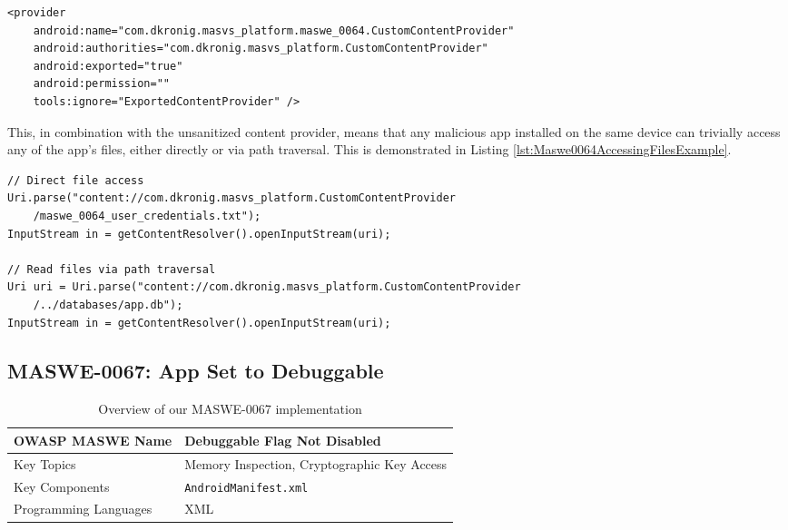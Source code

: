 \begin{lstlisting}[style=XMLStyle, float=tbh, captionpos=b, caption={Exporting the custom \texttt{ContentProvider}, making it accessible to other apps without enforcing permissions}, label={lst:Maswe0064ExportedProvider}]
<provider
    android:name="com.dkronig.masvs_platform.maswe_0064.CustomContentProvider"
    android:authorities="com.dkronig.masvs_platform.CustomContentProvider"
    android:exported="true"
    android:permission=""
    tools:ignore="ExportedContentProvider" />
\end{lstlisting}

This, in combination with the unsanitized content provider, means that any malicious app installed on the same device can trivially access any of the app's files, either directly or via path traversal. This is demonstrated in Listing \ref{lst:Maswe0064AccessingFilesExample}.

\begin{lstlisting}[style=JavaStyle, float=tbh, captionpos=b, caption={Accessing and reading files containing sensitive user data from malicious apps, both directly and using path traversal}, label={lst:Maswe0064AccessingFilesExample}]
// Direct file access 
Uri.parse("content://com.dkronig.masvs_platform.CustomContentProvider
    /maswe_0064_user_credentials.txt"); 
InputStream in = getContentResolver().openInputStream(uri); 

// Read files via path traversal
Uri uri = Uri.parse("content://com.dkronig.masvs_platform.CustomContentProvider
    /../databases/app.db"); 
InputStream in = getContentResolver().openInputStream(uri);
\end{lstlisting}


\subsection{MASWE-0067: App Set to Debuggable}
\label{subsec:maswe-0067}

\begin{table}[H]
    \centering
    \renewcommand{\arraystretch}{1.3}
        \begin{tabular}{p{5cm} p{8cm}} 
        \toprule
        OWASP MASWE Name & Debuggable Flag Not Disabled \\ 
        \midrule
        Key Topics & Memory Inspection, Cryptographic Key Access \\
        Key Components & \texttt{AndroidManifest.xml} \\
        Programming Languages & XML \\ 
        \bottomrule
        \end{tabular}
    \caption{Overview of our MASWE-0067 implementation}
    \label{tab:maswe-0067}
\end{table}

